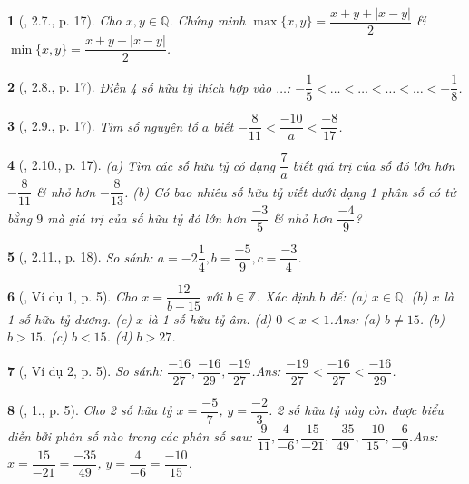 \documentclass{article}
\newtheorem{baitoan}{}
\begin{document}
\begin{baitoan}[\cite{Binh_boi_duong_Toan_7_tap_1}, 2.7., p. 17]
	Cho $x,y\in\mathbb{Q}$. Chứng minh $\max\{x,y\} = \dfrac{x + y + |x - y|}{2}$ \& $\min\{x,y\} = \dfrac{x + y -|x - y|}{2}$.
\end{baitoan}

\begin{baitoan}[\cite{Binh_boi_duong_Toan_7_tap_1}, 2.8., p. 17]
	Điền 4 số hữu tỷ thích hợp vào $\ldots$: $-\dfrac{1}{5} < \ldots < \ldots < \ldots < \ldots < -\dfrac{1}{8}$.
\end{baitoan}

\begin{baitoan}[\cite{Binh_boi_duong_Toan_7_tap_1}, 2.9., p. 17]
	Tìm số nguyên tố $a$ biết $-\dfrac{8}{11} < \dfrac{-10}{a} < \dfrac{-8}{17}$.
\end{baitoan}

\begin{baitoan}[\cite{Binh_boi_duong_Toan_7_tap_1}, 2.10., p. 17]
	(a) Tìm các số hữu tỷ có dạng $\dfrac{7}{a}$ biết giá trị của số đó lớn hơn $-\dfrac{8}{11}$ \& nhỏ hơn $-\dfrac{8}{13}$. (b) Có bao nhiêu số hữu tỷ viết dưới dạng 1 phân số có tử bằng $9$ mà giá trị của số hữu tỷ đó lớn hơn $\dfrac{-3}{5}$ \& nhỏ hơn $\dfrac{-4}{9}$?
\end{baitoan}

\begin{baitoan}[\cite{Binh_boi_duong_Toan_7_tap_1}, 2.11., p. 18]
	So sánh: $a = -2\dfrac{1}{4},b = \dfrac{-5}{9},c = \dfrac{-3}{4}$.
\end{baitoan}

\begin{baitoan}[\cite{Tuyen_Toan_7}, Ví dụ 1, p. 5]
	Cho $x = \dfrac{12}{b - 15}$ với $b\in\mathbb{Z}$. Xác định $b$ để: (a) $x\in\mathbb{Q}$. (b) $x$ là 1 số hữu tỷ dương. (c) $x$ là 1 số hữu tỷ âm. (d) $0 < x < 1$.\hfill{\sf Ans: (a) $b\ne 15$. (b) $b > 15$. (c) $b < 15$. (d) $b > 27$.}
\end{baitoan}

\begin{baitoan}[\cite{Tuyen_Toan_7}, Ví dụ 2, p. 5]
	So sánh: $\dfrac{-16}{27},\dfrac{-16}{29},\dfrac{-19}{27}$.\hfill{\sf Ans: $\dfrac{-19}{27} < \dfrac{-16}{27} < \dfrac{-16}{29}$.}
\end{baitoan}

\begin{baitoan}[\cite{Tuyen_Toan_7}, 1., p. 5]
	Cho 2 số hữu tỷ $x = \dfrac{-5}{7}$, $y = \dfrac{-2}{3}$. 2 số hữu tỷ này còn được biểu diễn bởi phân số nào trong các phân số sau: $\dfrac{9}{11},\dfrac{4}{-6},\dfrac{15}{-21},\dfrac{-35}{49},\dfrac{-10}{15},\dfrac{-6}{-9}$.\hfill{\sf Ans: $x = \dfrac{15}{-21} = \dfrac{-35}{49}$, $y = \dfrac{4}{-6} = \dfrac{-10}{15}$.}
\end{baitoan}
\end{document}
